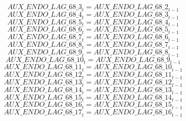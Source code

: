 \begin{dmath}
{AUX\_ENDO\_LAG\_68\_3}_{t}={AUX\_ENDO\_LAG\_68\_2}_{t-1}
\end{dmath}
\begin{dmath}
{AUX\_ENDO\_LAG\_68\_4}_{t}={AUX\_ENDO\_LAG\_68\_3}_{t-1}
\end{dmath}
\begin{dmath}
{AUX\_ENDO\_LAG\_68\_5}_{t}={AUX\_ENDO\_LAG\_68\_4}_{t-1}
\end{dmath}
\begin{dmath}
{AUX\_ENDO\_LAG\_68\_6}_{t}={AUX\_ENDO\_LAG\_68\_5}_{t-1}
\end{dmath}
\begin{dmath}
{AUX\_ENDO\_LAG\_68\_7}_{t}={AUX\_ENDO\_LAG\_68\_6}_{t-1}
\end{dmath}
\begin{dmath}
{AUX\_ENDO\_LAG\_68\_8}_{t}={AUX\_ENDO\_LAG\_68\_7}_{t-1}
\end{dmath}
\begin{dmath}
{AUX\_ENDO\_LAG\_68\_9}_{t}={AUX\_ENDO\_LAG\_68\_8}_{t-1}
\end{dmath}
\begin{dmath}
{AUX\_ENDO\_LAG\_68\_10}_{t}={AUX\_ENDO\_LAG\_68\_9}_{t-1}
\end{dmath}
\begin{dmath}
{AUX\_ENDO\_LAG\_68\_11}_{t}={AUX\_ENDO\_LAG\_68\_10}_{t-1}
\end{dmath}
\begin{dmath}
{AUX\_ENDO\_LAG\_68\_12}_{t}={AUX\_ENDO\_LAG\_68\_11}_{t-1}
\end{dmath}
\begin{dmath}
{AUX\_ENDO\_LAG\_68\_13}_{t}={AUX\_ENDO\_LAG\_68\_12}_{t-1}
\end{dmath}
\begin{dmath}
{AUX\_ENDO\_LAG\_68\_14}_{t}={AUX\_ENDO\_LAG\_68\_13}_{t-1}
\end{dmath}
\begin{dmath}
{AUX\_ENDO\_LAG\_68\_15}_{t}={AUX\_ENDO\_LAG\_68\_14}_{t-1}
\end{dmath}
\begin{dmath}
{AUX\_ENDO\_LAG\_68\_16}_{t}={AUX\_ENDO\_LAG\_68\_15}_{t-1}
\end{dmath}
\begin{dmath}
{AUX\_ENDO\_LAG\_68\_17}_{t}={AUX\_ENDO\_LAG\_68\_16}_{t-1}
\end{dmath}
